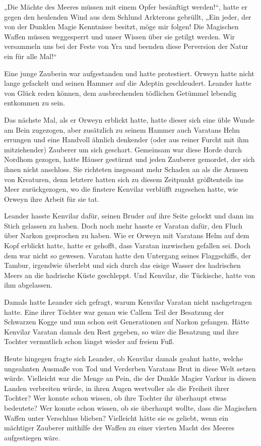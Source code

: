 \documentclass[10pt, a4paper, oneside]{book}
\begin{document}
„Die Mächte des Meeres müssen mit einem Opfer besänftigt werden!“, hatte er gegen den heulenden Wind aus dem Schlund Arkterons gebrüllt, „Ein jeder, der von der Dunklen Magie Kenntnisse besitzt, möge mir folgen! Die Magischen Waffen müssen weggesperrt und unser Wissen über sie getilgt werden. Wir versammeln uns bei der Feste von Yra und beenden diese Perversion der Natur ein für alle Mal!“

Eine junge Zauberin war aufgestanden und hatte protestiert. Orweyn hatte nicht lange gefackelt und seinen Hammer auf die Adeptin geschleudert. Leander hatte von Glück reden können, dem ausbrechenden tödlichen Getümmel lebendig entkommen zu sein.

Das nächste Mal, als er Orweyn erblickt hatte, hatte dieser sich eine üble Wunde am Bein zugezogen, aber zusätzlich zu seinem Hammer auch Varatans Helm errungen und eine Handvoll ähnlich denkender (oder aus reiner Furcht mit ihm mitziehender) Zauberer um sich geschart. Gemeinsam war diese Horde durch Nordhom gezogen, hatte Häuser gestürmt und jeden Zauberer gemordet, der sich ihnen nicht anschloss. Sie richteten insgesamt mehr Schaden an als die Armeen von Kreaturen, denn letztere hatten sich zu diesem Zeitpunkt größtenteils ins Meer zurückgezogen, wo die finstere Kenvilar verblüfft zugesehen hatte, wie Orweyn ihre Arbeit für sie tat.

Leander hasste Kenvilar dafür, seinen Bruder auf ihre Seite gelockt und dann im Stich gelassen zu haben. Doch noch mehr hasste er Varatan dafür, den Fluch über Narkon gesprochen zu haben. Wie er Orweyn mit Varatans Helm auf dem Kopf erblickt hatte, hatte er gehofft, dass Varatan inzwischen gefallen sei. Doch dem war nicht so gewesen. Varatan hatte den Untergang seines Flaggschiffs, der Tambur, irgendwie überlebt und sich durch das eisige Wasser des hadrischen Meers an die hadrische Küste geschleppt. Und Kenvilar, die Tückische, hatte von ihm abgelassen.

Damals hatte Leander sich gefragt, warum Kenvilar Varatan nicht nachgetragen hatte. Eine ihrer Töchter war genau wie Callem Teil der Besatzung der Schwarzen Kogge und nun schon seit Generationen auf Narkon gefangen. Hätte Kenvilar Varatan damals den Rest gegeben, so wäre die Besatzung und ihre Tochter vermutlich schon längst wieder auf freiem Fuß.

Heute hingegen fragte sich Leander, ob Kenvilar damals geahnt hatte, welche ungeahnten Ausmaße von Tod und Verderben Varatans Brut in diese Welt setzen würde. Vielleicht war die Menge an Pein, die der Dunkle Magier Varkur in diesen Landen verbreiten würde, in ihren Augen wertvoller als die Freiheit ihrer Tochter? Wer konnte schon wissen, ob ihre Tochter ihr überhaupt etwas bedeutete? Wer konnte schon wissen, ob sie überhaupt wollte, dass die Magischen Waffen unter Verschluss blieben? Vielleicht hätte sie es geliebt, wenn ein mächtiger Zauberer mithilfe der Waffen zu einer vierten Macht des Meeres aufgestiegen wäre.
\end{document}
